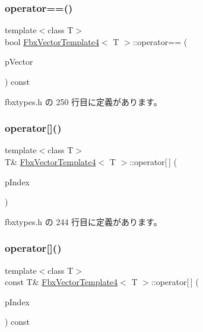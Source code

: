 \subsubsection{\texorpdfstring{operator==()}{operator==()}}
{\footnotesize\ttfamily template$<$class T$>$ \\
bool \hyperlink{class_fbx_vector_template4}{Fbx\+Vector\+Template4}$<$ T $>$\+::operator== (\begin{DoxyParamCaption}\item[{const \hyperlink{class_fbx_vector_template4}{Fbx\+Vector\+Template4}$<$ T $>$ \&}]{p\+Vector }\end{DoxyParamCaption}) const\hspace{0.3cm}{\ttfamily [inline]}}



 fbxtypes.\+h の 250 行目に定義があります。

\mbox{\label{class_fbx_vector_template4_a133f80e779cc4abca9113611c1989f2f}} 
\subsubsection{\texorpdfstring{operator[]()}{operator[]()}\hspace{0.1cm}{\footnotesize\ttfamily [1/2]}}
{\footnotesize\ttfamily template$<$class T$>$ \\
T\& \hyperlink{class_fbx_vector_template4}{Fbx\+Vector\+Template4}$<$ T $>$\+::operator\mbox{[}$\,$\mbox{]} (\begin{DoxyParamCaption}\item[{int}]{p\+Index }\end{DoxyParamCaption})\hspace{0.3cm}{\ttfamily [inline]}}



 fbxtypes.\+h の 244 行目に定義があります。

\mbox{\label{class_fbx_vector_template4_ac4c8037ce6a79dc4687946edc4fb527f}} 
\subsubsection{\texorpdfstring{operator[]()}{operator[]()}\hspace{0.1cm}{\footnotesize\ttfamily [2/2]}}
{\footnotesize\ttfamily template$<$class T$>$ \\
const T\& \hyperlink{class_fbx_vector_template4}{Fbx\+Vector\+Template4}$<$ T $>$\+::operator\mbox{[}$\,$\mbox{]} (\begin{DoxyParamCaption}\item[{int}]{p\+Index }\end{DoxyParamCaption}) const\hspace{0.3cm}{\ttfamily [inline]}}



